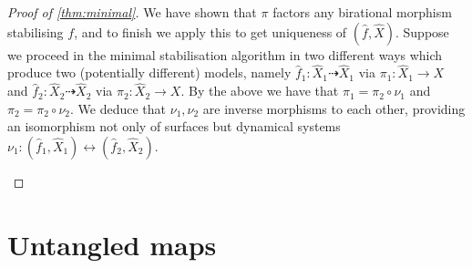 \documentclass[11pt, final]{amsart}
\newcommand{\dashto}{\dashrightarrow}
\newcommand{\Nice}{Untangled}
\DeclareMathOperator{\comp}{\mathfrak e}
\begin{document}
\begin{proof}[Proof of \autoref{thm:minimal}]
We have shown that $\pi$ factors any birational morphism stabilising $f$, and to finish we apply this to get uniqueness of $(\hat f, \hat X)$. Suppose we proceed in the minimal stabilisation algorithm in two different ways which produce two (potentially different) models, namely $\hat f_1 : \hat X_1 \dashto \hat X_1$ via $\pi_1 : \hat X_1 \to X$ and $\hat f_2 : \hat X_2 \dashto \hat X_2$ via $\pi_2 : \hat X_2 \to X$. By the above we have that $\pi_1 = \pi_2 \circ \nu_1$ and $\pi_2 = \pi_2 \circ \nu_2$. We deduce that $\nu_1, \nu_2$ are inverse morphisms to each other, providing an isomorphism not only of surfaces but dynamical systems $\nu_1 : (\hat f_1, \hat X_1) \leftrightarrow (\hat f_2, \hat X_2)$.
%
\begin{center}
\end{center}
\end{proof}


%

%


\section{\Nice{} maps}\label{sec:nice}
\end{document}
